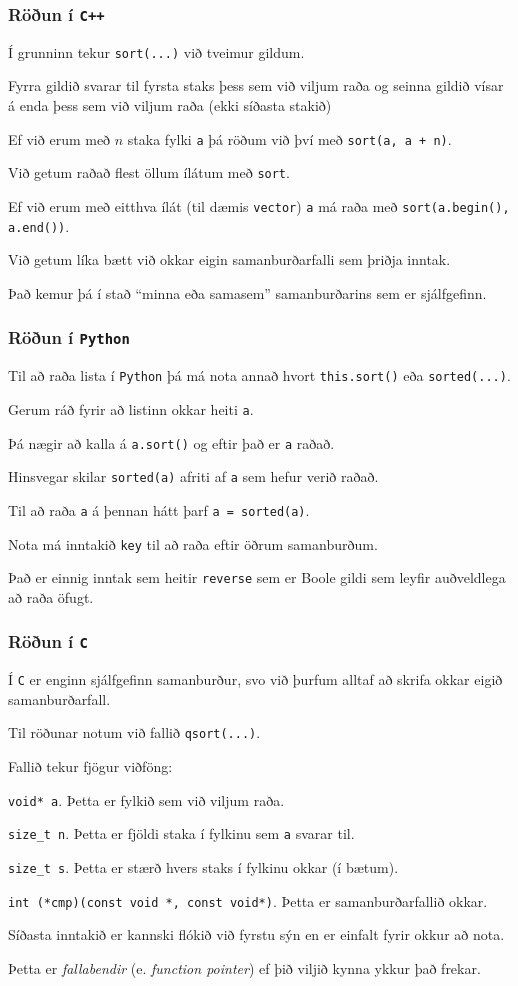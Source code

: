 {
	\frametitle{Röðun í \texttt{C++}}
	{
		\item<1-> Í grunninn tekur \texttt{sort(...)} við tveimur gildum.
		\item<2-> Fyrra gildið svarar til fyrsta staks þess sem við viljum raða og seinna gildið vísar á enda þess sem við viljum raða
			(ekki síðasta stakið)
		\item<3-> Ef við erum með $n$ staka fylki \texttt{a} þá röðum við því með \texttt{sort(a, a + n)}.
		\item<4-> Við getum raðað flest öllum ílátum með \texttt{sort}.
		\item<5-> Ef við erum með eitthva ílát (til dæmis \texttt{vector}) \texttt{a} má raða með \texttt{sort(a.begin(), a.end())}.
		\item<6-> Við getum líka bætt við okkar eigin samanburðarfalli sem þriðja inntak.
		\item<7-> Það kemur þá í stað ``minna eða samasem'' samanburðarins sem er sjálfgefinn.
	}
}

{
	\frametitle{Röðun í \texttt{Python}}
	{
		\item<1-> Til að raða lista í \texttt{Python} þá má nota annað hvort \texttt{this.sort()} eða \texttt{sorted(...)}.
		\item<2-> Gerum ráð fyrir að listinn okkar heiti \texttt{a}.
		\item<3-> Þá nægir að kalla á \texttt{a.sort()} og eftir það er \texttt{a} raðað.
		\item<4-> Hinsvegar skilar \texttt{sorted(a)} afriti af \texttt{a} sem hefur verið raðað.
		\item<5-> Til að raða \texttt{a} á þennan hátt þarf \texttt{a = sorted(a)}.
		\item<6-> Nota má inntakið \texttt{key} til að raða eftir öðrum samanburðum.
		\item<7-> Það er einnig inntak sem heitir \texttt{reverse} sem er Boole gildi sem leyfir auðveldlega að raða öfugt.
	}
}

{
	\frametitle{Röðun í \texttt{C}}
	{
		\item<1-> Í \texttt{C} er enginn sjálfgefinn samanburður, svo við þurfum alltaf að skrifa okkar eigið samanburðarfall.
		\item<2-> Til röðunar notum við fallið \texttt{qsort(...)}.
		\item<3-> Fallið tekur fjögur viðföng:
		{
			\item<4-> \texttt{void* a}. Þetta er fylkið sem við viljum raða.
			\item<5-> \texttt{size\_t n}. Þetta er fjöldi staka í fylkinu sem \texttt{a} svarar til.
			\item<6-> \texttt{size\_t s}. Þetta er stærð hvers staks í fylkinu okkar (í bætum).
			\item<7-> \texttt{int (*cmp)(const void *, const void*)}. Þetta er samanburðarfallið okkar.
		}
		\item<8-> Síðasta inntakið er kannski flókið við fyrstu sýn en er einfalt fyrir okkur að nota.
		\item<9-> Þetta er \emph{fallabendir} (e. \emph{function pointer}) ef þið viljið kynna ykkur það frekar.
	}
}

